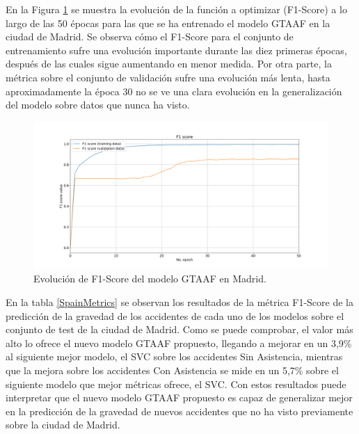 En la Figura \ref{MadridLossFunction} se muestra la evolución de la función a optimizar (F1-Score) a lo largo de las 50 épocas para las que se ha entrenado el modelo GTAAF en la ciudad de Madrid. Se observa cómo el F1-Score para el conjunto de entrenamiento sufre una evolución importante durante las diez primeras épocas, después de las cuales sigue aumentando en menor medida. Por otra parte, la métrica sobre el conjunto de validación sufre una evolución más lenta, hasta aproximadamente la época 30 no se ve una clara evolución en la generalización del modelo sobre datos que nunca ha visto.


\begin{figure}[h]
	\centering
	\includegraphics[width=160mm]{Figures/Madrid/madrid_convolution_2d_f1_score_2023-12-03-12 54 29.png}
	\caption{Evolución de F1-Score del modelo GTAAF en Madrid.}
	\label{MadridLossFunction}
\end{figure}

En la tabla \ref{SpainMetrics} se observan los resultados de la métrica F1-Score de la predicción de la gravedad de los accidentes de cada uno de los modelos sobre el conjunto de test de la ciudad de Madrid. Como se puede comprobar, el valor más alto lo ofrece el nuevo modelo GTAAF propuesto, llegando a mejorar en un 3,9\% al siguiente mejor modelo, el SVC sobre los accidentes Sin Asistencia, mientras que la mejora sobre los accidentes Con Asistencia se mide en un 5,7\% sobre el siguiente modelo que mejor métricas ofrece, el SVC. Con estos resultados puede interpretar que el nuevo modelo GTAAF propuesto es capaz de generalizar mejor en la predicción de la gravedad de nuevos accidentes que no ha visto previamente sobre la ciudad de Madrid.

